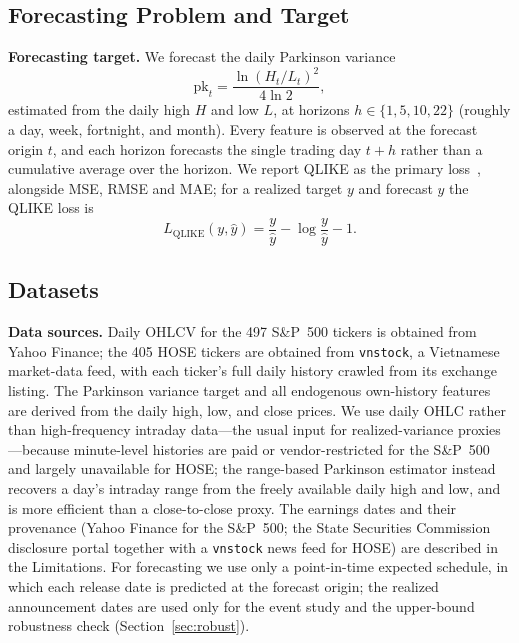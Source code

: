 \documentclass[runningheads]{llncs}
\begin{document}
\subsection{Forecasting Problem and Target}
\indent\textbf{Forecasting target.} We forecast the daily Parkinson variance
\[\mathrm{pk}_t=\frac{\ln(H_t/L_t)^2}{4\ln 2},\]
estimated from the daily high $H$ and low $L$, at horizons $h\in\{1,5,10,22\}$ (roughly a day, week,
fortnight, and month). Every feature is observed at the forecast origin $t$, and each horizon forecasts
the single trading day $t+h$ rather than a cumulative average over the horizon. We report QLIKE as the
primary loss~\cite{patton2011}, alongside MSE, RMSE and MAE; for a realized target $y$ and forecast
$\hat y$ the QLIKE loss is
\[ L_{\mathrm{QLIKE}}(y,\hat y)=\frac{y}{\hat y}-\log\frac{y}{\hat y}-1. \]

\subsection{Datasets}
\textbf{Data sources.} Daily OHLCV for the 497 S\&P~500 tickers is obtained from Yahoo Finance;
the 405 HOSE tickers are obtained from \texttt{vnstock}, a
Vietnamese market-data feed, with each ticker's full daily history crawled from its exchange listing. The
Parkinson variance target and all endogenous own-history features are derived from the daily high, low,
and close prices. We use daily OHLC rather than high-frequency intraday data---the usual input for
realized-variance proxies---because minute-level histories are paid or vendor-restricted for the
S\&P~500 and largely unavailable for HOSE; the range-based Parkinson estimator instead recovers a day's
intraday range from the freely available daily high and low, and is more efficient than a close-to-close
proxy. The earnings dates and their provenance (Yahoo Finance for the S\&P~500; the State
Securities Commission disclosure portal together with a \texttt{vnstock} news feed for HOSE) are described
in the Limitations. For forecasting we use only a point-in-time expected schedule, in which each release
date is predicted at the forecast origin; the realized announcement dates are used only for the event
study and the upper-bound robustness check (Section~\ref{sec:robust}).
\end{document}
